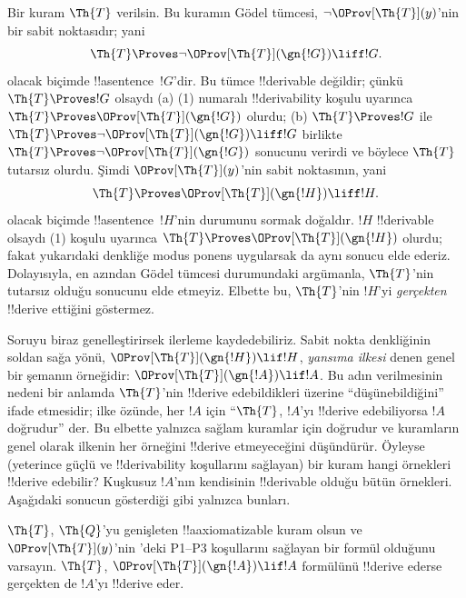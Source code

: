 



Bir kuram $\Th{T}$ verilsin. Bu kuramın G\"odel tümcesi,
$\lnot \OProv[\Th{T}](y)$'nin bir sabit noktasıdır; yani
\[
\Th{T} \Proves \lnot \OProv[\Th{T}](\gn{!G}) \liff !G.
\]
olacak biçimde !!a{sentence}~$!G$'dir. Bu tümce !!{derivable} değildir;
çünkü $\Th{T} \Proves !G$ olsaydı (a) (1) numaralı !!{derivability} koşulu
uyarınca $\Th{T} \Proves \OProv[\Th{T}](\gn{!G})$ olurdu; (b)
$\Th{T} \Proves !G$ ile
$\Th{T} \Proves \lnot \OProv[\Th{T}](\gn{!G}) \liff !G$ birlikte
$\Th{T} \Proves \lnot \OProv[\Th{T}](\gn{!G})$ sonucunu verirdi ve böylece
$\Th{T}$ tutarsız olurdu. Şimdi $\OProv[\Th{T}](y)$'nin sabit noktasının,
yani
\[
\Th{T} \Proves \OProv[\Th{T}](\gn{!H}) \liff !H.
\]
olacak biçimde !!a{sentence}~$!H$'nin durumunu sormak doğaldır. $!H$
!!{derivable} olsaydı (1) koşulu uyarınca
$\Th{T} \Proves \OProv[\Th{T}](\gn{!H})$ olurdu; fakat yukarıdaki denkliğe
modus ponens uygularsak da aynı sonucu elde ederiz. Dolayısıyla, en azından
G\"odel tümcesi durumundaki argümanla, $\Th{T}$'nin tutarsız olduğu sonucunu
elde etmeyiz. Elbette bu, $\Th{T}$'nin $!H$'yi \emph{gerçekten}
!!{derive} ettiğini göstermez.

Soruyu biraz genelleştirirsek ilerleme kaydedebiliriz. Sabit nokta denkliğinin
soldan sağa yönü, $\OProv[\Th{T}](\gn{!H}) \lif !H$, \emph{yansıma ilkesi}
denen genel bir şemanın örneğidir:
$\OProv[\Th{T}](\gn{!A}) \lif !A$. Bu adın verilmesinin nedeni bir anlamda
$\Th{T}$'nin !!{derive} edebildikleri üzerine ``düşünebildiğini'' ifade
etmesidir; ilke özünde, her $!A$ için ``$\Th{T}$, $!A$'yı !!{derive}
edebiliyorsa $!A$ doğrudur'' der. Bu elbette yalnızca sağlam kuramlar için
doğrudur ve kuramların genel olarak ilkenin her örneğini !!{derive}
etmeyeceğini düşündürür. Öyleyse (yeterince güçlü ve !!{derivability}
koşullarını sağlayan) bir kuram hangi örnekleri !!{derive} edebilir? Kuşkusuz
$!A$'nın kendisinin !!{derivable} olduğu bütün örnekleri. Aşağıdaki sonucun
gösterdiği gibi yalnızca bunları.

\begin{thm}
$\Th{T}$, $\Th{Q}$'yu genişleten !!a{axiomatizable} kuram olsun ve
$\OProv[\Th{T}](y)$'nin
'deki P1--P3 koşullarını sağlayan bir formül olduğunu
varsayın. $\Th{T}$, $\OProv[\Th{T}](\gn{!A}) \lif !A$ formülünü !!{derive}
ederse gerçekten de $!A$'yı !!{derive} eder.
\end{thm}

